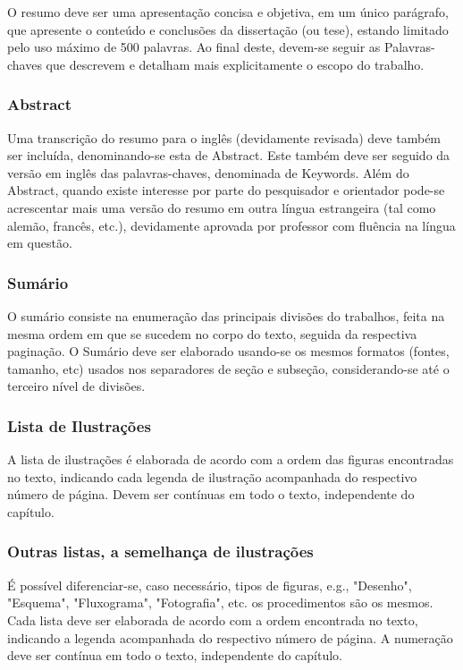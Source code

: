 \documentclass[repeatfields,xlists,xpacks,oneside]{ufrgscca}
\begin{document}
O resumo deve ser uma apresentação concisa e objetiva, em um único
parágrafo, que apresente o conteúdo e conclusões da dissertação (ou tese),
estando limitado pelo uso máximo de 500 palavras. Ao final deste, devem-se
seguir as Palavras-chaves que descrevem e detalham mais explicitamente o
escopo do trabalho.

\subsubsection{Abstract}

Uma transcrição do resumo para o inglês (devidamente revisada) deve também
ser incluída, denominando-se esta de Abstract. Este também deve ser seguido
da versão em inglês das palavras-chaves, denominada de Keywords. Além do
Abstract, quando existe interesse por parte do pesquisador e orientador
pode-se acrescentar mais uma versão do resumo em outra língua estrangeira
(tal como alemão, francês, etc.), devidamente aprovada por professor com
fluência na língua em questão.

\subsubsection{Sumário}

O sumário consiste na enumeração das principais divisões do trabalhos, feita
na mesma ordem em que se sucedem no corpo do texto, seguida da respectiva
paginação. O Sumário deve ser elaborado usando-se os mesmos formatos
(fontes, tamanho, etc) usados nos separadores de seção e subseção,
considerando-se até o terceiro nível de divisões.

\subsubsection{Lista de Ilustrações}

A lista de ilustrações é elaborada de acordo com a ordem das figuras
encontradas no texto, indicando cada legenda de ilustração acompanhada do
respectivo número de página. Devem ser contínuas em todo o texto,
independente do capítulo.

\subsubsection{Outras listas, a semelhança de ilustrações}

É possível diferenciar-se, caso necessário, tipos de figuras, e.g., "Desenho", "Esquema", "Fluxograma", "Fotografia", etc. os procedimentos são os mesmos.
Cada lista deve ser  elaborada de acordo com a ordem encontrada no texto,
indicando a legenda  acompanhada do
respectivo número de página. A numeração deve ser contínua em todo o texto,
independente do capítulo.
\end{document}
